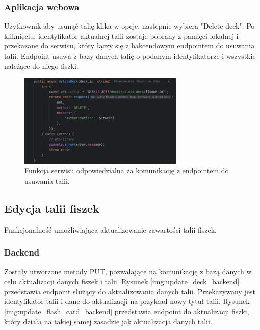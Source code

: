 \subsubsection{Aplikacja webowa}

Użytkownik aby usunąć talię klika w opcje, następnie wybiera "Delete deck". Po kliknięciu, identyfikator aktualnej talii zostaje pobrany z pamięci lokalnej i przekazane do serwisu, który łączy się z bakcendowym endpointem do usuwania talii. Endpoint usuwa z bazy danych talię o podanym identyfikatorze i wszystkie należące do niego fiszki.

\begin{figure}[H]
    \centering
    \includegraphics[width=0.7\textwidth]{chapters/chapter_8/screens/delete_deck_web}
    \caption{Funkcja serwisu odpowiedzialna za komunikację z endpointem do usuwania talii.}
    \label{img:delete_deck_web}
\end{figure}

\subsection{Edycja talii fiszek}

Funkcjonalność umożliwiająca aktualizowanie zawartości talii fiszek.

\subsubsection{Backend}

Zostały utworzone metody PUT, pozwalające na komunikację z bazą danych w celu aktualizacji danych fiszek i talii. Rysunek \ref{img:update_deck_backend} przedstawia endpoint służący do aktualizowania danych talii. Przekazywany jest identyfikator talii i dane do aktualizacji na przykład nowy tytuł talii. Rysunek \ref{img:update_flash_card_backend} przedstawia endpoint do aktualizacji fiszki, który działa na takiej samej zasadzie  jak aktualizacja danych talii.

